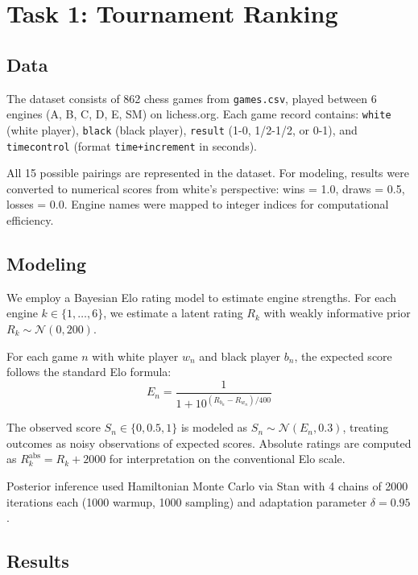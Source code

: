 \section{Task 1: Tournament Ranking}
\subsection{Data}

  The dataset consists of 862 chess games from \texttt{games.csv}, played between 6 engines (A, B, C, D, E, SM) on lichess.org. Each game record contains: \texttt{white}
  (white player), \texttt{black} (black player), \texttt{result} (1-0, 1/2-1/2, or 0-1), and \texttt{timecontrol} (format \texttt{time+increment} in seconds).

  All 15 possible pairings are represented in the dataset. For modeling, results were converted to numerical scores from white's perspective: wins = 1.0, draws = 0.5, losses =
   0.0. Engine names were mapped to integer indices for computational efficiency.

  \subsection{Modeling}

  We employ a Bayesian Elo rating model to estimate engine strengths. For each engine $k \in \{1, \ldots, 6\}$, we estimate a latent rating $R_k$ with weakly informative prior
   $R_k \sim \mathcal{N}(0, 200)$.

  For each game $n$ with white player $w_n$ and black player $b_n$, the expected score follows the standard Elo formula:
  \begin{equation}
  E_n = \frac{1}{1 + 10^{(R_{b_n} - R_{w_n})/400}}
  \end{equation}

  The observed score $S_n \in \{0, 0.5, 1\}$ is modeled as $S_n \sim \mathcal{N}(E_n, 0.3)$, treating outcomes as noisy observations of expected scores. Absolute ratings are
  computed as $R_k^{\text{abs}} = R_k + 2000$ for interpretation on the conventional Elo scale.

  Posterior inference used Hamiltonian Monte Carlo via Stan with 4 chains of 2000 iterations each (1000 warmup, 1000 sampling) and adaptation parameter $\delta = 0.95$.

\subsection{Results}

